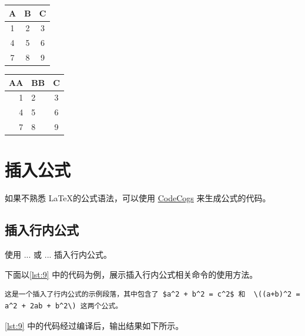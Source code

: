 \documentclass[a4paper]{article}
\begin{document}
\begin{center}
    \label{tab:1}
    \begin{tabular}{|c|c|c|}   
        \hline
        A & B & C \\
        \hline
        1 & 2 & 3 \\
        \hline
        4 & 5 & 6 \\
        \hline
        7 & 8 & 9 \\
        \hline
    \end{tabular}
\end{center}

\begin{center}
    \label{tab:2}
    \begin{tabular}{r||l c|}
        \hline
        AA & BB & C \\
        \hline
        1 & 2 & 3 \\
        4 & 5 & 6 \\
        \hline
        \hline
        7 & 8 & 9 \\
    \end{tabular}
\end{center}

\section{插入公式}

如果不熟悉 \LaTeX 的公式语法，可以使用 \href{https://www.codecogs.com/latex/eqneditor.php}{CodeCogs} 来生成公式的代码。

\subsection{插入行内公式}

使用 \texttt{$...$} 或 \texttt{\(...\)} 插入行内公式。

下面以\cref{lst:9} 中的代码为例，展示插入行内公式相关命令的使用方法。

\begin{center}
    \label{lst:9}
    \begin{verbatim}
这是一个插入了行内公式的示例段落，其中包含了 $a^2 + b^2 = c^2$ 和  \((a+b)^2 = a^2 + 2ab + b^2\) 这两个公式。
    \end{verbatim}
\end{center}

\cref{lst:9} 中的代码经过编译后，输出结果如下所示。
\end{document}
